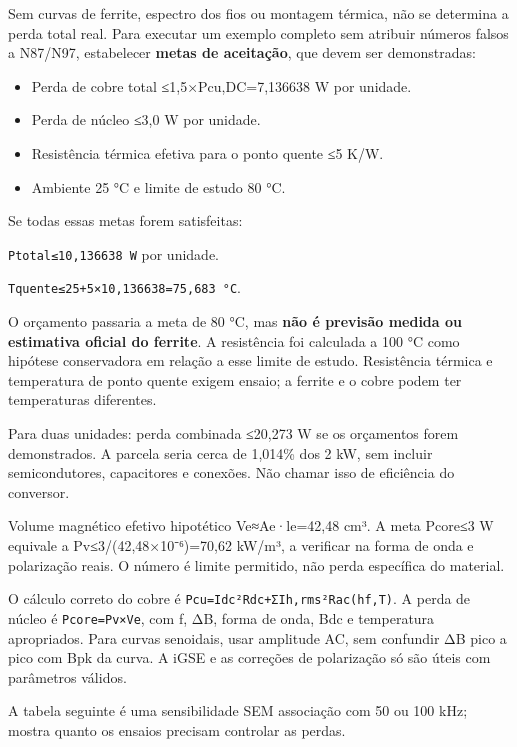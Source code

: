 \documentclass[
]{article}
\providecommand{\tightlist}{%
  \setlength{\itemsep}{0pt}\setlength{\parskip}{0pt}}
\begin{document}
Sem curvas de ferrite, espectro dos fios ou montagem térmica, não se
determina a perda total real. Para executar um exemplo completo sem
atribuir números falsos a N87/N97, estabelecer \textbf{metas de
aceitação}, que devem ser demonstradas:

\begin{itemize}
\tightlist
\item
  Perda de cobre total ≤1,5×Pcu,DC=7,136638 W por unidade.
\item
  Perda de núcleo ≤3,0 W por unidade.
\item
  Resistência térmica efetiva para o ponto quente ≤5 K/W.
\item
  Ambiente 25 °C e limite de estudo 80 °C.
\end{itemize}

Se todas essas metas forem satisfeitas:

\texttt{Ptotal≤10,136638\ W} por unidade.

\texttt{Tquente≤25+5×10,136638=75,683\ °C}.

O orçamento passaria a meta de 80 °C, mas \textbf{não é previsão medida
ou estimativa oficial do ferrite}. A resistência foi calculada a 100 °C
como hipótese conservadora em relação a esse limite de estudo.
Resistência térmica e temperatura de ponto quente exigem ensaio; a
ferrite e o cobre podem ter temperaturas diferentes.

Para duas unidades: perda combinada ≤20,273 W se os orçamentos forem
demonstrados. A parcela seria cerca de 1,014\% dos 2 kW, sem incluir
semicondutores, capacitores e conexões. Não chamar isso de eficiência do
conversor.

Volume magnético efetivo hipotético Ve≈Ae·le=42,48 cm³. A meta Pcore≤3 W
equivale a Pv≤3/(42,48×10⁻⁶)=70,62 kW/m³, a verificar na forma de onda e
polarização reais. O número é limite permitido, não perda específica do
material.

O cálculo correto do cobre é \texttt{Pcu=Idc²Rdc+ΣIh,rms²Rac(hf,T)}. A
perda de núcleo é \texttt{Pcore=Pv×Ve}, com f, ΔB, forma de onda, Bdc e
temperatura apropriados. Para curvas senoidais, usar amplitude AC, sem
confundir ΔB pico a pico com Bpk da curva. A iGSE e as correções de
polarização só são úteis com parâmetros válidos.

A tabela seguinte é uma sensibilidade SEM associação com 50 ou 100 kHz;
mostra quanto os ensaios precisam controlar as perdas.
\end{document}

